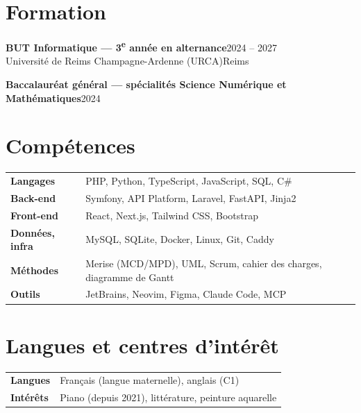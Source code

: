 \documentclass[10pt,a4paper]{article}
\newcommand{\entry}[4]{%
  \textbf{#1}\hfill{\color{muted}#2}\\
  {\color{accent}#3}\hfill{\color{muted}\small #4}\par\vspace{0.2ex}}
\begin{document}
\section{Formation}

\entry{BUT Informatique — 3\textsuperscript{e} année en alternance}{2024 -- 2027}
      {Université de Reims Champagne-Ardenne (URCA)}{Reims}
\vspace{0.6ex}
\textbf{Baccalauréat général — spécialités Science Numérique et Mathématiques}\hfill{\color{muted}2024}\par

\section{Compétences}
\begin{tabularx}{\linewidth}{@{}>{\bfseries}l X@{}}
  Langages       & PHP, Python, TypeScript, JavaScript, SQL, C\# \\
  Back-end       & Symfony, API Platform, Laravel, FastAPI, Jinja2 \\
  Front-end      & React, Next.js, Tailwind CSS, Bootstrap \\
  Données, infra & MySQL, SQLite, Docker, Linux, Git, Caddy \\
  Méthodes       & Merise (MCD/MPD), UML, Scrum, cahier des charges, diagramme de Gantt \\
  Outils         & JetBrains, Neovim, Figma, Claude Code, MCP \\
\end{tabularx}

\section{Langues et centres d'intérêt}
\begin{tabularx}{\linewidth}{@{}>{\bfseries}l X@{}}
  Langues   & Français (langue maternelle), anglais (C1) \\
  Intérêts  & Piano (depuis 2021), littérature, peinture aquarelle \\
\end{tabularx}
\end{document}
